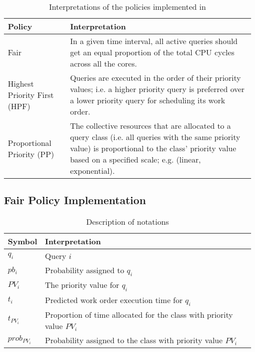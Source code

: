 \begin{table}[t]
\centering
\begin{tabular}{|p{1.3cm}|p{6.5cm}|}
\hline
\textbf{Policy} & \textbf{Interpretation} \\ \hline
Fair & In a given time interval, all active queries should get an equal proportion of the total CPU cycles across all the cores. \\ \hline%
Highest Priority First (HPF) & 
Queries are executed in the order of their priority values; i.e. a higher priority query is preferred over a lower priority query for scheduling its work order. \\ \hline
Proportional Priority (PP) & 
The collective resources that are allocated to a query class (i.e. all queries with the same priority value) is proportional to the class' priority value based on a specified scale; e.g. (linear, exponential).
\\ \hline
\end{tabular}
\caption{Interpretations of the policies implemented in \sys{}}
\label{table:policy-interpreatations}
	\vspace{-2.8em}
\end{table}

\subsection{Fair Policy Implementation}\label{ssec:fairness}
\begin{table}[t]
	\centering
	\begin{tabular}{|p{}|p{}|}
		\hline
		\textbf{Symbol} & \textbf{Interpretation} \\ \hline
		$q_{i}$ & Query $i$ \\ \hline
		$pb_{i}$ & Probability assigned to $q_{i}$ \\ \hline
		$PV_{i}$ & The priority value for $q_{i}$ \\ \hline
		$t_{i}$ & Predicted work order execution time for $q_{i}$ \\ \hline
		$t_{PV_{i}}$ & Proportion of time allocated for the class with priority value $PV_{i}$ \\ \hline
		$prob_{PV_{i}}$ & Probability assigned to the class with priority value $PV_{i}$ \\ \hline
	\end{tabular}
	\vspace{0.4em}
	\caption{Description of notations}
	\label{table:policy-notations}
	\vspace{-3em}
\end{table}

